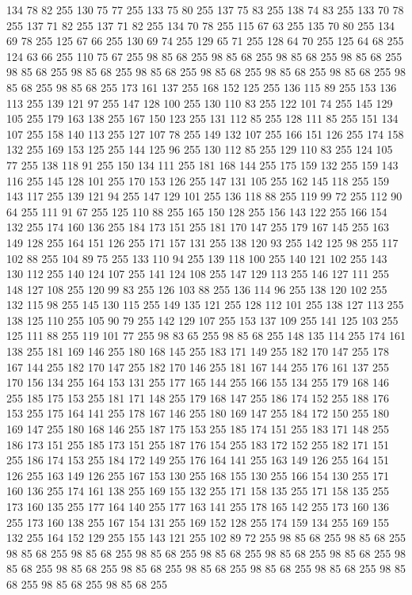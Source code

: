 134 78 82 255 130 75 77 255 133 75 80 255 137 75 83 255 138 74 83 255 133 70 78 255 137 71 82 255 137 71 82 255 134 70 78 255 115 67 63 255 135 70 80 255 134 69 78 255 125 67 66 255 130 69 74 255 129 65 71 255 128 64 70 255 125 64 68 255 124 63 66 255 110 75 67 255 98 85 68 255 98 85 68 255 98 85 68 255 98 85 68 255 98 85 68 255 98 85 68 255 98 85 68 255 98 85 68 255 98 85 68 255 98 85 68 255 98 85 68 255 98 85 68 255 173 161 137 255 168 152 125 255 136 115 89 255 153 136 113 255 139 121 97 255 147 128 100 255 130 110 83 255 122 101 74 255 145 129 105 255 179 163 138 255 167 150 123 255 131 112 85 255 128 111 85 255 151 134 107 255 158 140 113 255 127 107 78 255 149 132 107 255 166 151 126 255 174 158 132 255 169 153 125 255 144 125 96 255 130 112 85 255 129 110 83 255 124 105 77 255 138 118 91 255 150 134 111 255 181 168 144 255 175 159 132 255 159 143 116 255 145 128 101 255 170 153 126 255 147 131 105 255 162 145 118 255
159 143 117 255 139 121 94 255 147 129 101 255 136 118 88 255 119 99 72 255 112 90 64 255 111 91 67 255 125 110 88 255 165 150 128 255 156 143 122 255 166 154 132 255 174 160 136 255 184 173 151 255 181 170 147 255 179 167 145 255 163 149 128 255 164 151 126 255 171 157 131 255 138 120 93 255 142 125 98 255 117 102 88 255 104 89 75 255 133 110 94 255 139 118 100 255 140 121 102 255 143 130 112 255 140 124 107 255 141 124 108 255 147 129 113 255 146 127 111 255 148 127 108 255 120 99 83 255 126 103 88 255 136 114 96 255 138 120 102 255 132 115 98 255 145 130 115 255 149 135 121 255 128 112 101 255 138 127 113 255 138 125 110 255 105 90 79 255 142 129 107 255 153 137 109 255 141 125 103 255 125 111 88 255 119 101 77 255 98 83 65 255 98 85 68 255 148 135 114 255 174 161 138 255 181 169 146 255 180 168 145 255 183 171 149 255 182 170 147 255 178 167 144 255 182 170 147 255 182 170 146 255 181 167 144 255 176 161 137 255 170 156 134 255 164 153 131 255 177 165 144 255 166 155 134 255
179 168 146 255 185 175 153 255 181 171 148 255 179 168 147 255 186 174 152 255 188 176 153 255 175 164 141 255 178 167 146 255 180 169 147 255 184 172 150 255 180 169 147 255 180 168 146 255 187 175 153 255 185 174 151 255 183 171 148 255 186 173 151 255 185 173 151 255 187 176 154 255 183 172 152 255 182 171 151 255 186 174 153 255 184 172 149 255 176 164 141 255 163 149 126 255 164 151 126 255 163 149 126 255 167 153 130 255 168 155 130 255 166 154 130 255 171 160 136 255 174 161 138 255 169 155 132 255 171 158 135 255 171 158 135 255 173 160 135 255 177 164 140 255 177 163 141 255 178 165 142 255 173 160 136 255 173 160 138 255 167 154 131 255 169 152 128 255 174 159 134 255 169 155 132 255 164 152 129 255 155 143 121 255 102 89 72 255 98 85 68 255 98 85 68 255 98 85 68 255 98 85 68 255 98 85 68 255 98 85 68 255 98 85 68 255 98 85 68 255 98 85 68 255 98 85 68 255 98 85 68 255 98 85 68 255 98 85 68 255 98 85 68 255 98 85 68 255 98 85 68 255 98 85 68 255
